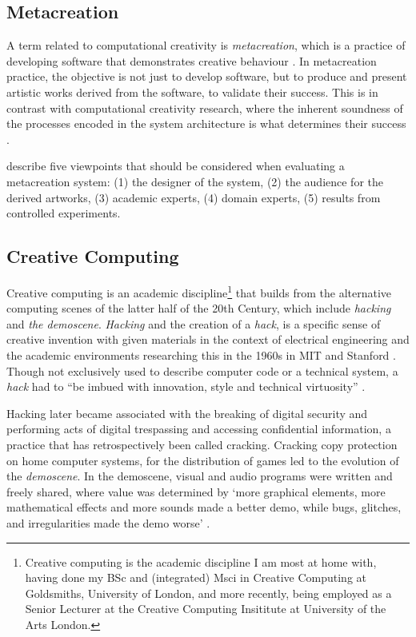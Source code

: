 \subsection{Metacreation}

A term related to computational creativity is \textit{metacreation}, which is a practice of developing software that demonstrates creative behaviour \citep{whitelaw2004metacreation}. 
In metacreation practice, the objective is not just to develop software, but to produce and present artistic works derived from the software, to validate their success. 
This is in contrast with computational creativity research, where the inherent soundness of the processes encoded in the system architecture is what determines their success \citep{colton2008creativity}.

\cite{eigenfeldt2012evaluating} describe five viewpoints that should be considered when evaluating a metacreation system: (1) the designer of the system, (2) the audience for the derived artworks, (3) academic experts, (4) domain experts, (5) results from controlled experiments.  

\subsection{Creative Computing}

Creative computing is an academic discipline\footnote{Creative computing is the academic discipline I am most at home with, having done my BSc and (integrated) Msci in Creative Computing at Goldsmiths, University of London, and more recently, being employed as a Senior Lecturer at the Creative Computing Insititute at University of the Arts London.}
that builds from the alternative computing scenes of the latter half of the 20th Century, which include  \textit{hacking} and \textit{the demoscene}. 
\textit{Hacking} and the creation of a \textit{hack}, is a specific sense of creative invention with given materials in the context of electrical engineering and the academic environments researching this in the 1960s in MIT and Stanford \citep{wark2006hackers}. 
Though not exclusively used to describe computer code or a technical system, a \textit{hack} had to ``be imbued with innovation, style and technical virtuosity'' \citep{levy1984hackers}.

Hacking later became associated with the breaking of digital security and performing acts of digital trespassing and accessing confidential information, a practice that has retrospectively been called cracking. 
Cracking copy protection on home computer systems, for the distribution of games led to the evolution of the \textit{demoscene}. In the demoscene, visual and audio programs were written and freely shared, where value was determined by ‘more graphical elements, more mathematical effects and more sounds made a better demo, while bugs, glitches, and irregularities made the demo worse’ \citep{carlsson2019forgotten}.

